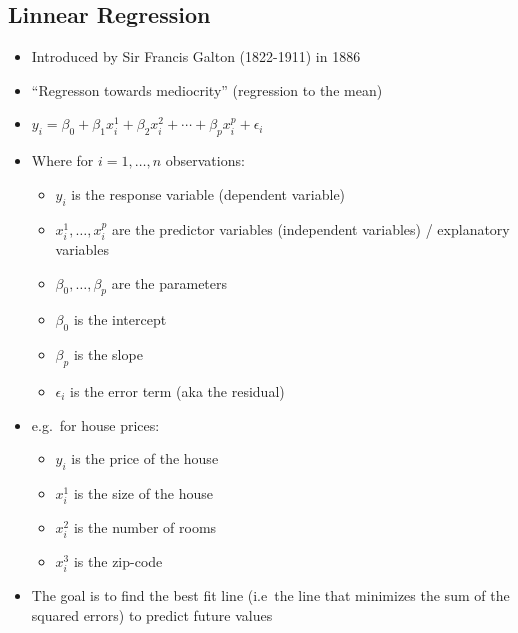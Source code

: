 \documentclass[12pt]{article}
\begin{document}
        \subsection{Linnear Regression}
            \begin{itemize}
                \item Introduced by Sir Francis Galton (1822-1911) in 1886
                \item ``Regresson towards mediocrity'' (regression to the mean)
                \item $y_i = \beta_0 + \beta_1 x_i^1 + \beta_2 x_i^2 + \cdots + \beta_p x_i^p + \epsilon_i$
                \item Where for $i = 1, \ldots, n$ observations:
                \begin{itemize}
                    \item $y_i$ is the response variable (dependent variable)
                    \item $x_i^1, \ldots, x_i^p$ are the predictor variables (independent variables) / explanatory variables
                    \item $\beta_0, \ldots, \beta_p$ are the parameters
                    \item $\beta_0$ is the intercept
                    \item $\beta_p$ is the slope
                    \item $\epsilon_i$ is the error term (aka the residual)
                \end{itemize}
                \item e.g.\ for house prices:
                \begin{itemize}
                    \item $y_i$ is the price of the house
                    \item $x_i^1$ is the size of the house
                    \item $x_i^2$ is the number of rooms
                    \item $x_i^3$ is the zip-code
                \end{itemize}
                \item The goal is to find the best fit line (i.e\ the line that minimizes the sum of the squared errors) to predict future values
            \end{itemize}
\end{document}
